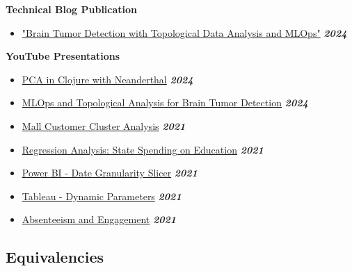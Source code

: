 \documentclass[11pt,letterpaper]{article}
\begin{document}
\textbf{Technical Blog Publication}
\begin{itemize}
    \item \href{https://www.linkedin.com/pulse/yet-another-machine-learning-operations-article-yano-malopa-salvo-tfa5c/}{"Brain Tumor Detection with Topological Data Analysis and MLOps"} \hfill \textbf{\textit{2024}}
\end{itemize}

\textbf{YouTube Presentations}
\begin{itemize}
    \item \href{https://www.youtube.com/watch?v=6OI5C2qv2Ic}{PCA in Clojure with Neanderthal} \hfill \textbf{\textit{2024}}
    \item \href{https://www.youtube.com/watch?v=jPSfAPUtcms}{MLOps and Topological Analysis for Brain Tumor Detection} \hfill \textbf{\textit{2024}}
    \item \href{https://www.youtube.com/watch?v=lM-S4-HRaTQ}{Mall Customer Cluster Analysis} \hfill \textbf{\textit{2021}}
    \item \href{https://www.youtube.com/watch?v=oTqLzrN_n4k}{Regression Analysis: State Spending on Education} \hfill \textbf{\textit{2021}}
    \item \href{https://www.youtube.com/watch?v=6ks-ipmTZww}{Power BI - Date Granularity Slicer} \hfill \textbf{\textit{2021}}
    \item \href{https://www.youtube.com/watch?v=MVvIU2CgIeg}{Tableau - Dynamic Parameters} \hfill \textbf{\textit{2021}}
    \item \href{https://www.youtube.com/watch?v=cGN9kq1gJQ4}{Absenteeism and Engagement} \hfill \textbf{\textit{2021}}
\end{itemize}

\subsection*{Equivalencies}
   
\end{document}
